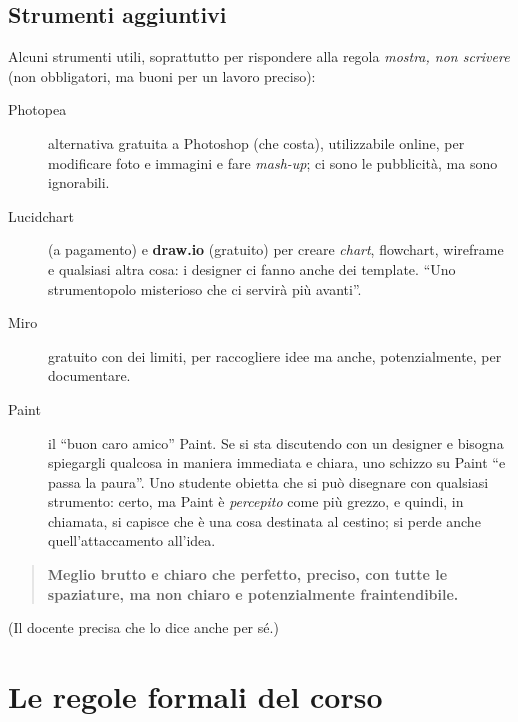 \subsection{Strumenti aggiuntivi}



Alcuni strumenti utili, soprattutto per rispondere alla regola \emph{mostra,
non scrivere} (non obbligatori, ma buoni per un lavoro preciso):
\begin{description}
  \item[Photopea] alternativa gratuita a Photoshop (che costa), utilizzabile
        online, per modificare foto e immagini e fare \emph{mash-up}; ci sono
        le pubblicità, ma sono ignorabili.
  \item[Lucidchart] (a pagamento) e \textbf{draw.io} (gratuito) per creare
        \emph{chart}, flowchart, wireframe e qualsiasi altra cosa: i designer
        ci fanno anche dei template. ``Uno strumentopolo misterioso che ci
        servirà più avanti''.
  \item[Miro] gratuito con dei limiti, per raccogliere idee ma anche,
        potenzialmente, per documentare.
  \item[Paint] il ``buon caro amico'' Paint. Se si sta discutendo con un
        designer e bisogna spiegargli qualcosa in maniera immediata e chiara,
        uno schizzo su Paint ``e passa la paura''. Uno studente obietta che si
        può disegnare con qualsiasi strumento: certo, ma Paint è
        \emph{percepito} come più grezzo, e quindi, in chiamata, si capisce
        che è una cosa destinata al cestino; si perde anche quell'attaccamento
        all'idea.
\end{description}

\begin{quote}
\centering
\textbf{Meglio brutto e chiaro che perfetto, preciso, con tutte le
spaziature, ma non chiaro e potenzialmente fraintendibile.}
\end{quote}
(Il docente precisa che lo dice anche per sé.)

\section{Le regole formali del corso}
\label{sec:regole-formali}



